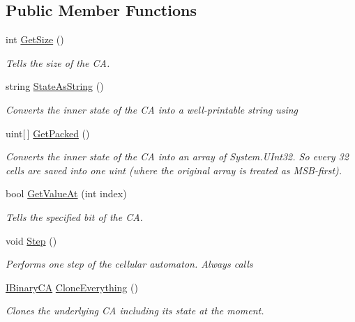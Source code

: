 \subsection*{Public Member Functions}
\begin{DoxyCompactItemize}
\item 
int \hyperlink{interface_cellular_1_1_i_binary_c_a_ae9a650d8dac5a23ebb051b00e2dc3dee}{Get\+Size} ()
\begin{DoxyCompactList}\small\item\em Tells the size of the C\+A. \end{DoxyCompactList}\item 
string \hyperlink{interface_cellular_1_1_i_binary_c_a_ab70ebcefac0ca22dd06661f3316a6c2e}{State\+As\+String} ()
\begin{DoxyCompactList}\small\item\em Converts the inner state of the C\+A into a well-\/printable string using \end{DoxyCompactList}\item 
uint\mbox{[}$\,$\mbox{]} \hyperlink{interface_cellular_1_1_i_binary_c_a_a62f943d92c7aedd121f99940ff12c63e}{Get\+Packed} ()
\begin{DoxyCompactList}\small\item\em Converts the inner state of the C\+A into an array of {\ttfamily System.\+U\+Int32}. So every 32 cells are saved into one uint (where the original array is treated as M\+S\+B-\/first). \end{DoxyCompactList}\item 
bool \hyperlink{interface_cellular_1_1_i_binary_c_a_a809b66186b663b64d85db59237693b52}{Get\+Value\+At} (int index)
\begin{DoxyCompactList}\small\item\em Tells the specified bit of the C\+A. \end{DoxyCompactList}\item 
void \hyperlink{interface_cellular_1_1_i_binary_c_a_a6a04c7374538c49df07efa176e0dd3c3}{Step} ()
\begin{DoxyCompactList}\small\item\em Performs one step of the cellular automaton. Always calls \end{DoxyCompactList}\item 
\hyperlink{interface_cellular_1_1_i_binary_c_a}{I\+Binary\+C\+A} \hyperlink{interface_cellular_1_1_i_binary_c_a_a0d5610129c1f7aee62d6521ba8268cf9}{Clone\+Everything} ()
\begin{DoxyCompactList}\small\item\em Clones the underlying C\+A including its state at the moment. \end{DoxyCompactList}\item 

\end{DoxyCompactItemize}
